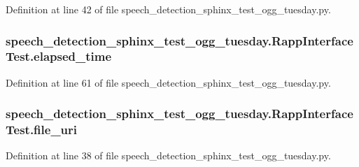 Definition at line 42 of file speech\-\_\-detection\-\_\-sphinx\-\_\-test\-\_\-ogg\-\_\-tuesday.\-py.

\hypertarget{classspeech__detection__sphinx__test__ogg__tuesday_1_1RappInterfaceTest_a7489f4e4554c48afd803a3cee91c96af}{
\subsubsection[{elapsed\-\_\-time}]{\setlength{\rightskip}{0pt plus 5cm}speech\-\_\-detection\-\_\-sphinx\-\_\-test\-\_\-ogg\-\_\-tuesday.\-Rapp\-Interface\-Test.\-elapsed\-\_\-time}}\label{classspeech__detection__sphinx__test__ogg__tuesday_1_1RappInterfaceTest_a7489f4e4554c48afd803a3cee91c96af}


Definition at line 61 of file speech\-\_\-detection\-\_\-sphinx\-\_\-test\-\_\-ogg\-\_\-tuesday.\-py.

\hypertarget{classspeech__detection__sphinx__test__ogg__tuesday_1_1RappInterfaceTest_aad9f84b21e9d2be851acd96decea81dd}{
\subsubsection[{file\-\_\-uri}]{\setlength{\rightskip}{0pt plus 5cm}speech\-\_\-detection\-\_\-sphinx\-\_\-test\-\_\-ogg\-\_\-tuesday.\-Rapp\-Interface\-Test.\-file\-\_\-uri}}\label{classspeech__detection__sphinx__test__ogg__tuesday_1_1RappInterfaceTest_aad9f84b21e9d2be851acd96decea81dd}


Definition at line 38 of file speech\-\_\-detection\-\_\-sphinx\-\_\-test\-\_\-ogg\-\_\-tuesday.\-py.

